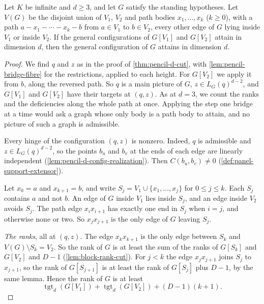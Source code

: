 \begin{theorem}
  \label{thm:pencil-d-bridge}
  \leanok
  Let $K$ be infinite and $d \ge 3$, and let $G$ satisfy the standing
  hypotheses. Let $V(G)$ be the disjoint union of $V_1$, $V_2$ and path
  bodies $x_1, \dots, x_k$ ($k \ge 0$), with a path
  $a - x_1 - \cdots - x_k - b$ from $a \in V_1$ to $b \in V_2$, every
  other edge of $G$ lying inside $V_1$ or inside $V_2$. If the general
  configurations of $G[V_1]$ and $G[V_2]$ attain in dimension $d$, then
  the general configuration of $G$ attains in dimension $d$.
\end{theorem}
\begin{proof}
  \leanok
  We find $q$ and $z$ as in the proof of \cref{thm:pencil-d-cut}, with
  \cref{lem:pencil-bridge-fibre} for the restrictions, applied to each
  height. For $G[V_2]$ we apply it from $b$, along the reversed path. So
  $q$ is a main picture of $G$, $z \in L_G(q)^{d-2}$, and $G[V_1]$ and
  $G[V_2]$ have their targets at $(q, z)$. As at $d = 3$, we count the
  ranks and the deficiencies along the whole path at once. Applying the
  step one bridge at a time would ask a graph whose only body is a path
  body to attain, and no picture of such a graph is admissible.

  Every hinge of the configuration $(q, z)$ is nonzero. Indeed, $q$ is
  admissible and $z \in L_G(q)^{d-2}$, so the points $b_u$ and $b_v$ at
  the ends of each edge are linearly independent
  (\cref{lem:pencil-d-config-realization}). Then
  $C(b_u, b_v) \neq 0$ (\cref{def:panel-support-extensor}).

  Let $x_0 = a$ and $x_{k+1} = b$, and write
  $S_j = V_1 \cup \{x_1, \dots, x_j\}$ for $0 \le j \le k$. Each $S_j$
  contains $a$ and not $b$. An edge of $G$ inside $V_1$ lies inside
  $S_j$, and an edge inside $V_2$ avoids $S_j$. The path edge
  $x_i x_{i+1}$ has exactly one end in $S_j$ when $i = j$, and otherwise
  none or two. So $x_j x_{j+1}$ is the only edge of $G$ leaving $S_j$.

  \emph{The ranks}, all at $(q, z)$. The edge $x_k x_{k+1}$ is the only
  edge between $S_k$ and $V(G) \setminus S_k = V_2$. So the rank of $G$
  is at least the sum of the ranks of $G[S_k]$ and $G[V_2]$ and $D - 1$
  (\cref{lem:block-rank-cut}). For $j < k$ the edge $x_j x_{j+1}$ joins
  $S_j$ to $x_{j+1}$, so the rank of $G[S_{j+1}]$ is at least the rank of
  $G[S_j]$ plus $D - 1$, by the same lemma. Hence the rank of $G$ is at
  least
  \[
    \operatorname{tgt}_d(G[V_1]) + \operatorname{tgt}_d(G[V_2])
    + (D - 1)(k + 1).
  \]


\end{proof}
